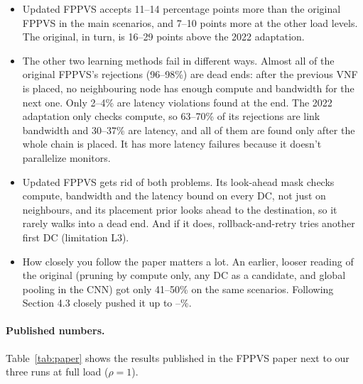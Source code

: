 \begin{itemize}
  \item Updated FPPVS accepts 11--14 percentage points more than the original
  FPPVS in the main scenarios, and 7--10 points more at the other load levels.
  The original, in turn, is 16--29 points above the 2022 adaptation.
  \item The other two learning methods fail in different ways. Almost all of the
  original FPPVS's rejections (96--98\%) are dead ends: after the previous VNF is
  placed, no neighbouring node has enough compute and bandwidth for the next one.
  Only 2--4\% are latency violations found at the end. The 2022 adaptation only
  checks compute, so 63--70\% of its rejections are link bandwidth and 30--37\%
  are latency, and all of them are found only after the whole chain is placed.
  It has more latency failures because it doesn't parallelize monitors.
  \item Updated FPPVS gets rid of both problems. Its look-ahead mask checks
  compute, bandwidth and the latency bound on every DC, not just on neighbours,
  and its placement prior looks ahead to the destination, so it rarely walks
  into a dead end. And if it does, rollback-and-retry tries another first DC
  (limitation L3).
  \item How closely you follow the paper matters a lot. An earlier, looser
  reading of the original (pruning by compute only, any DC as a candidate, and
  global pooling in the CNN) got only 41--50\% on the same scenarios. Following
  Section 4.3 closely pushed it up to \origMinAcc--\origMaxAcc\%.
\end{itemize}

\paragraph{Published numbers.} Table~\ref{tab:paper} shows the results published
in the FPPVS paper next to our three runs at full load ($\rho=1$).

\begin{table}[H]
\centering\small
\caption{Published FPPVS results (Tables 6 and 7 of the paper) next to our runs
of the original FPPVS, the 2022 adaptation and updated FPPVS at load 1.0. Values
come from different data and settings; see the text before comparing them.}
\label{tab:paper}

\end{table}

